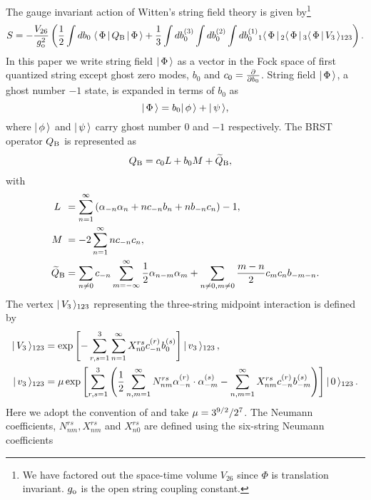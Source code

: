 \documentclass[a4paper,12pt]{article}
\begin{document}
The gauge invariant action of Witten's string field theory is
given by\footnote{
We have factored out the space-time volume $V_{26}$ since $\Phi$ is
translation invariant. $g_{\rm o}$ is the open string coupling
constant.
}
\begin{equation}
  \label{gauge-inv-S}
  S = -\frac{V_{26}}{g_{\rm o}^2} \left( \frac{1}{2} \int db_0\;
                    \langle \, \Phi \,|\, Q_{\text B} \,|\, \Phi\, \rangle
      + \frac{1}{3} \int db_0^{(3)}\int db_0^{(2)}\int db_0^{(1)}
                    {}_1\langle \, \Phi \,|\,{}_2\langle \, \Phi \,|\, {}_3\langle \, \Phi \,|\, V_3\, \rangle_{123} \right).
\end{equation}
In this paper we write string field $|\, \Phi\, \rangle$ as a vector in the
Fock space of first quantized string except ghost zero modes, $b_0$
and $c_0=\frac{\partial{}}{\partial{b_0}}$.
String field $|\, \Phi\, \rangle$, a ghost number $-1$ state,
is expanded in terms of $b_0$ as
\begin{equation}
  \label{unfixed_Phi}
  |\, \Phi\, \rangle = b_0 |\, \phi\, \rangle + |\, \psi\, \rangle ,
\end{equation}
where $|\, \phi\, \rangle$ and $|\, \psi\, \rangle$ carry ghost number $0$ and $-1$
respectively.
The BRST operator $Q_{\text B}$ is represented as
\begin{align}
  Q_{\text B} & = c_0 L + b_0 M + \widetilde Q_{\text B},
\end{align}
with
\begin{align}
  L \;\, & = \sum_{n=1}^{\infty}\left(
  \alpha_{-n}\alpha_{n} + n c_{-n}b_{n} + n b_{-n}c_{n} \right) -1,\\
  M \; & = -2 \sum_{n=1}^{\infty} n c_{-n}c_{n},\\
  \widetilde Q_{\text B} & = \sum_{n\neq 0}c_{-n} \sum_{m=-\infty}^{\infty} \frac{1}{2}
            \alpha_{n-m}\alpha_{m}
            + \sum_{n\neq 0, m\neq 0} \frac{m-n}{2} c_m c_n b_{-m-n}.
\end{align}
The vertex $|\, V_3\, \rangle_{123}$ representing the three-string midpoint
interaction is defined by \cite{Samuel:1986yw,Gross:1987ia}
\begin{align}
  \label{V3}
  |\, V_3\, \rangle_{123} & = \exp\left[-\sum_{r,s=1}^{3}
    \sum_{n=1}^{\infty}X^{rs}_{n0}c^{(r)}_{-n}b^{(s)}_{0}
    \right]|\, v_3\, \rangle_{123}\, ,\\
  \label{v3}
    |\, v_3\, \rangle_{123} & = \mu\exp\left[\sum_{r,s=1}^{3}
    \left( \frac{1}{2}\sum_{n,m=1}^{\infty}
    N^{rs}_{nm}\alpha^{(r)}_{-n}\cdot\alpha^{(s)}_{-m}
    - \sum_{n,m=1}^{\infty}X^{rs}_{nm}c^{(r)}_{-n}b^{(s)}_{-m} \right)
  \right]|\, 0\, \rangle_{123}\,.
\end{align}
Here we adopt the convention of \cite{Moeller:2000xv} and take
$\mu=3^{9/2}/2^7$.
The Neumann coefficients, $N^{rs}_{nm}, X^{rs}_{nm}$ and
$X^{rs}_{n0}$ are defined using the six-string Neumann coefficients
\end{document}
